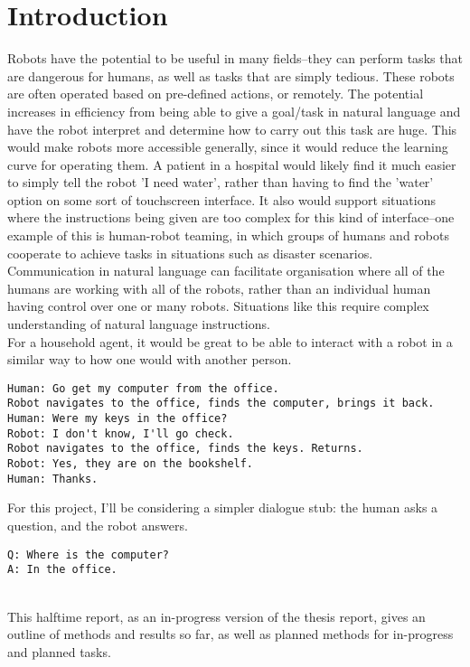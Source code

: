 \chapter{Introduction}
Robots have the potential to be useful in many fields–they can perform tasks that are dangerous for humans, as well as tasks that are simply tedious. These robots are often operated based on pre-defined actions, or remotely. The potential increases in efficiency from being able to give a goal/task in natural language and have the robot interpret and determine how to carry out this task are huge. This would make robots more accessible generally, since it would reduce the learning curve for operating them. A patient in a hospital would likely find it much easier to simply tell the robot 'I need water', rather than having to find the 'water' option on some sort of touchscreen interface. It also would support situations where the instructions being given are too complex for this kind of interface--one example of this is human-robot teaming, in which groups of humans and robots cooperate to achieve tasks in situations such as disaster scenarios\cite{Kruijff-Korbayova:2015aa}. Communication in natural language can facilitate organisation where all of the humans are working with all of the robots, rather than an individual human having control over one or many robots. Situations like this require complex understanding of natural language instructions. \\
For a household agent, it would be great to be able to interact with a robot in a similar way to how one would with another person. 
\begin{verbatim}
Human: Go get my computer from the office. 
Robot navigates to the office, finds the computer, brings it back. 
Human: Were my keys in the office?
Robot: I don't know, I'll go check. 
Robot navigates to the office, finds the keys. Returns.
Robot: Yes, they are on the bookshelf. 
Human: Thanks. 
\end{verbatim}
For this project, I'll be considering a simpler dialogue stub: the human asks a question, and the robot answers. 
\begin{verbatim}
Q: Where is the computer?
A: In the office. 
\end{verbatim}
\\
This halftime report, as an in-progress version of the thesis report, gives an outline of methods and results so far, as well as planned methods for in-progress and planned tasks. 
